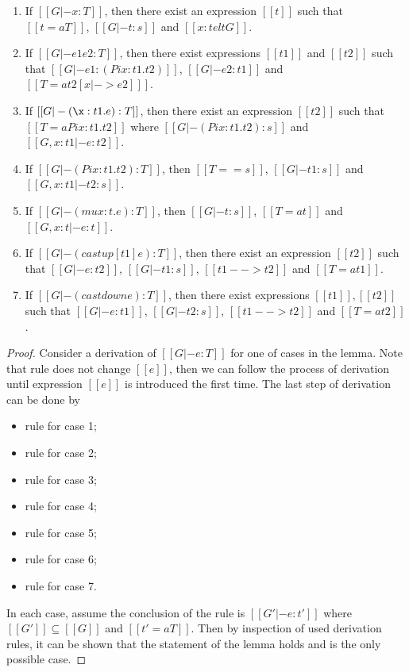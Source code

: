 \begin{lem}\label{lem:gen}
$\quad$
\begin{enumerate}[(1)]
	\item If $[[G |- x:T]]$, then there exist an expression $[[t]]$ such that $[[t =a T]]$, $[[G |- t:s]]$ and $[[x:t elt G]]$.
	\item If $[[G |- e1 e2:T]]$, then there exist expressions $[[t1]]$ and $[[t2]]$ such that $[[G |- e1 : (Pi x:t1.t2)]]$, $[[G |- e2:t1]]$ and $[[T =a t2[x |-> e2] ]]$.
	\item If $[[G |- (\x:t1.e):T]]$, then there exist an expression $[[t2]]$ such that $[[T =a Pi x:t1.t2]]$ where $[[G |- (Pi x:t1.t2):s]]$ and $[[G,x:t1 |- e:t2]]$.
    \item If $[[G |- (Pi x:t1.t2):T]]$, then $[[T == s]]$, $[[G |- t1:s]]$ and $[[G, x:t1 |- t2:s]]$.
	\item If $[[G |- (mu x:t.e):T]]$, then $[[G |- t:s]]$, $[[T =a t]]$ and $[[G, x:t|-e:t]]$.
	\item If $[[G |- (castup [t1] e):T]]$, then there exist an expression $[[t2]]$ such that $[[G |- e:t2]]$, $[[G |- t1:s]]$, $[[t1 --> t2]]$ and $[[T =a t1]]$.
	\item If $[[G |- (castdown e):T]]$, then there exist expressions $[[t1]],[[t2]]$ such that $[[G |- e:t1]]$, $[[G |- t2:s]]$, $[[t1 --> t2]]$ and $[[T =a t2]]$.
\end{enumerate}
\end{lem}

\begin{proof}
    Consider a derivation of $[[G |- e:T]]$ for one of cases in the lemma. Note that rule  does not change $[[e]]$, then we can follow the process of derivation until expression $[[e]]$ is introduced the first time. The last step of derivation can be done by
    \begin{itemize}
        \item rule  for case 1;
        \item rule  for case 2;
        \item rule  for case 3;
        \item rule  for case 4;
        \item rule  for case 5;
        \item rule  for case 6;
        \item rule  for case 7.
    \end{itemize}
    In each case, assume the conclusion of the rule is $[[G' |- e : t']]$ where $[[G']] \subseteq [[G]]$ and $[[t' =a T]]$. Then by inspection of used derivation rules, it can be shown that the statement of the lemma holds and is the only possible case.
\end{proof}

